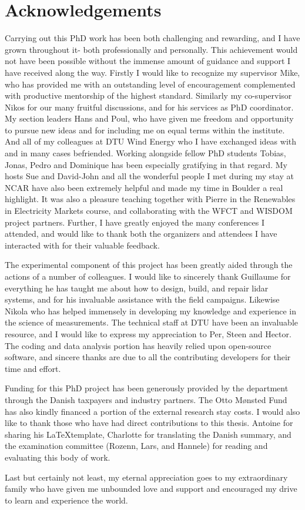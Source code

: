 \chapter{Acknowledgements}
\label{sec:acknowledgements}
\begin{small}

Carrying out this PhD work has been both challenging and rewarding, and I have grown throughout it- both professionally and personally. This achievement would not have been possible without the immense amount of guidance and support I have received along the way. Firstly I would like to recognize my supervisor Mike, who has provided me with an outstanding level of encouragement complemented with productive mentorship of the highest standard. Similarly my co-supervisor Nikos for our many fruitful discussions, and for his services as PhD coordinator. My section leaders Hans and Poul, who have given me freedom and opportunity to pursue new ideas and for including me on equal terms within the institute. And all of my colleagues at DTU Wind Energy who I have exchanged ideas with and in many cases befriended. Working alongside fellow PhD students Tobias, Jonas, Pedro and Dominique has been especially gratifying in that regard. My hosts Sue and David-John and all the wonderful people I met during my stay at NCAR have also been extremely helpful and made my time in Boulder a real highlight. It was also a pleasure teaching together with Pierre in the Renewables in Electricity Markets course, and collaborating with the WFCT and WISDOM project partners. Further, I have greatly enjoyed the many conferences I attended, and would like to thank both the organizers and attendees I have interacted with for their valuable feedback.

The experimental component of this project has been greatly aided through the actions of a number of colleagues. I would like to sincerely thank Guillaume for everything he has taught me about how to design, build, and repair lidar systems, and for his invaluable assistance with the field campaigns. Likewise Nikola who has helped immensely in developing my knowledge and experience in the science of measurements. The technical staff at DTU have been an invaluable resource, and I would like to express my appreciation to Per, Steen and Hector. The coding and data analysis portion has heavily relied upon open-source software, and sincere thanks are due to all the contributing developers for their time and effort.

Funding for this PhD project has been generously provided by the department through the Danish taxpayers and industry partners. The Otto M{\o}nsted Fund has also kindly financed a portion of the external research stay costs. I would also like to thank those who have had direct contributions to this thesis. Antoine for sharing his \LaTeX template, Charlotte for translating the Danish summary, and the examination committee (Rozenn, Lars, and Hannele) for reading and evaluating this body of work.

Last but certainly not least, my eternal appreciation goes to my extraordinary family who have given me unbounded love and support and encouraged my drive to learn and experience the world.

\end{small}